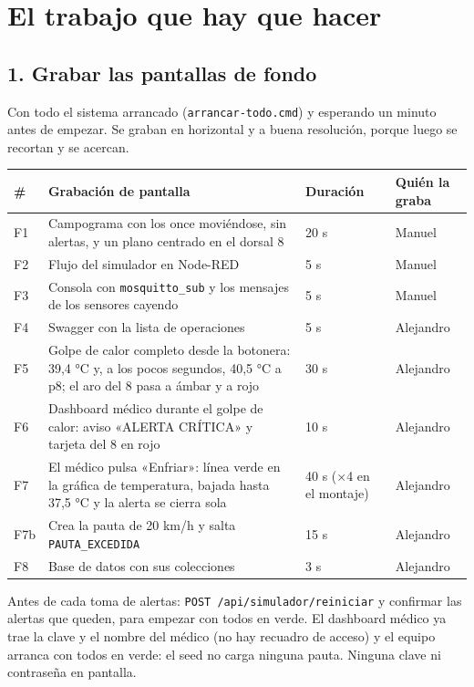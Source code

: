 \documentclass[11pt,a4paper]{article}
\begin{document}
\section*{El trabajo que hay que hacer}

\subsection*{1. Grabar las pantallas de fondo}

Con todo el sistema arrancado (\texttt{arrancar-todo.cmd}) y esperando un minuto antes de empezar. Se graban en horizontal y a buena resolución, porque luego se recortan y se acercan.

\begin{longtable}{P{0.7cm}P{10.2cm}P{1.6cm}P{2.6cm}}
\toprule
\textbf{\#} & \textbf{Grabación de pantalla} & \textbf{Duración} & \textbf{Quién la graba} \\
\midrule
\endhead
F1 & Campograma con los once moviéndose, sin alertas, y un plano centrado en el dorsal 8 & 20 s & Manuel \\
F2 & Flujo del simulador en Node-RED & 5 s & Manuel \\
F3 & Consola con \texttt{mosquitto\_sub} y los mensajes de los sensores cayendo & 5 s & Manuel \\
F4 & Swagger con la lista de operaciones & 5 s & Alejandro \\
F5 & Golpe de calor completo desde la botonera: 39,4 °C y, a los pocos segundos, 40,5 °C a p8; el aro del 8 pasa a ámbar y a rojo & 30 s & Alejandro \\
F6 & Dashboard médico durante el golpe de calor: aviso «ALERTA CRÍTICA» y tarjeta del 8 en rojo & 10 s & Alejandro \\
F7 & El médico pulsa «Enfriar»: línea verde en la gráfica de temperatura, bajada hasta 37,5 °C y la alerta se cierra sola & 40 s (×4 en el montaje) & Alejandro \\
F7b & Crea la pauta de 20 km/h y salta \texttt{PAUTA\_EXCEDIDA} & 15 s & Alejandro \\
F8 & Base de datos con sus colecciones & 3 s & Alejandro \\
\bottomrule
\end{longtable}

Antes de cada toma de alertas: \texttt{POST /api/simulador/reiniciar} y confirmar las alertas que queden, para empezar con todos en verde. El dashboard médico ya trae la clave y el nombre del médico (no hay recuadro de acceso) y el equipo arranca con todos en verde: el seed no carga ninguna pauta. Ninguna clave ni contraseña en pantalla.
\end{document}
